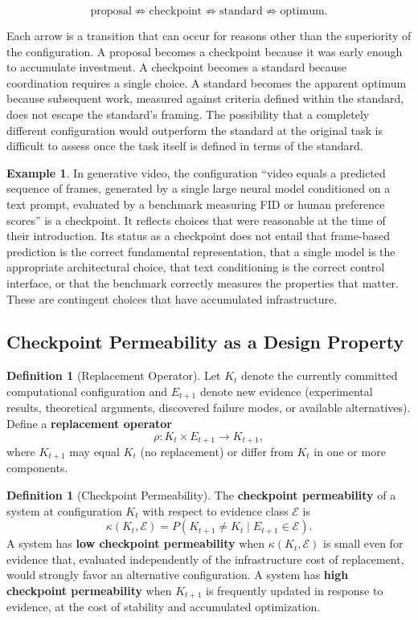 \documentclass[11pt,a4paper]{article}
\theoremstyle{plain}
\theoremstyle{definition}
\newtheorem{definition}[theorem]{Definition}
\newtheorem{example}[theorem]{Example}
\theoremstyle{remark}
\begin{document}
\[
\text{proposal} \not\Rightarrow \text{checkpoint} \not\Rightarrow \text{standard} \not\Rightarrow \text{optimum}.
\]

Each arrow is a transition that can occur for reasons other than the superiority of the configuration. A proposal becomes a checkpoint because it was early enough to accumulate investment. A checkpoint becomes a standard because coordination requires a single choice. A standard becomes the apparent optimum because subsequent work, measured against criteria defined within the standard, does not escape the standard's framing. The possibility that a completely different configuration would outperform the standard at the original task is difficult to assess once the task itself is defined in terms of the standard.

\begin{example}
In generative video, the configuration ``video equals a predicted sequence of frames, generated by a single large neural model conditioned on a text prompt, evaluated by a benchmark measuring FID or human preference scores'' is a checkpoint. It reflects choices that were reasonable at the time of their introduction. Its status as a checkpoint does not entail that frame-based prediction is the correct fundamental representation, that a single model is the appropriate architectural choice, that text conditioning is the correct control interface, or that the benchmark correctly measures the properties that matter. These are contingent choices that have accumulated infrastructure.
\end{example}

\subsection{Checkpoint Permeability as a Design Property}

\begin{definition}[Replacement Operator]
Let $K_t$ denote the currently committed computational configuration and $E_{t+1}$ denote new evidence (experimental results, theoretical arguments, discovered failure modes, or available alternatives). Define a \textbf{replacement operator}
\[
\rho : K_t \times E_{t+1} \to K_{t+1},
\]
where $K_{t+1}$ may equal $K_t$ (no replacement) or differ from $K_t$ in one or more components.
\end{definition}

\begin{definition}[Checkpoint Permeability]
The \textbf{checkpoint permeability} of a system at configuration $K_t$ with respect to evidence class $\mathcal{E}$ is
\[
\kappa(K_t, \mathcal{E}) = P(K_{t+1} \neq K_t \mid E_{t+1} \in \mathcal{E}).
\]
A system has \textbf{low checkpoint permeability} when $\kappa(K_t, \mathcal{E})$ is small even for evidence that, evaluated independently of the infrastructure cost of replacement, would strongly favor an alternative configuration. A system has \textbf{high checkpoint permeability} when $K_{t+1}$ is frequently updated in response to evidence, at the cost of stability and accumulated optimization.
\end{definition}
\end{document}
